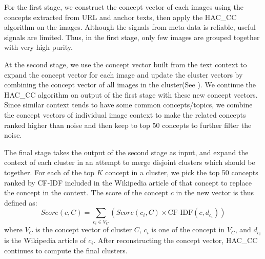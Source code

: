 For the first stage, we construct the concept vector of each images
using the concepts extracted from URL and anchor texts,
then apply the HAC\_CC algorithm on the images. Although the signals
from meta data is reliable, useful signals are limited.
Thus, in the first stage, only few images are grouped
together with very high purity.

At the second stage, we use the concept vector built from the text context to
expand the concept vector for each image and update the cluster vectors
by combining the concept vector of all images in the cluster(See ). 
We continue the HAC\_CC algorithm on output of the first stage with these 
new concept vectors. Since similar context tends to have some common concepts/topics, 
we combine the concept vectors of individual image context to make the related concepts 
ranked higher than noise and then keep to top 50 concepts to further filter the noise.

The final stage takes the output of the second stage as input, and expand the
context of each cluster in an attempt to merge disjoint clusters which should be
together.
For each of the top $K$ concept in a cluster, we pick the top 50 concepts ranked
by CF-IDF included in the Wikipedia article of that concept to replace the concept
in the context.  The score of the concept $c$ in the new vector is thus defined as:
\begin{equation}
\label{expv}
Score(c, C)=\sum_{c_i\in V_C}\left({Score(c_i, C) \times \mbox{CF-IDF}(c, d_{c_i})}\right)
\end{equation}
where $V_C$ is the concept vector of cluster $C$, $c_i$ is one of the concept in
$V_C$, and $d_{c_i}$ is the Wikipedia article of $c_i$.
After reconstructing the concept vector,
HAC\_CC continues to compute the final clusters.

